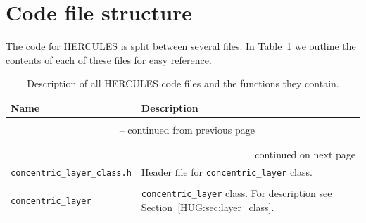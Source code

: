 \documentclass[11pt, oneside]{article}   	%
\begin{document}
\vspace{0.5 cm}

\section{Code file structure}
\label{HUG:sec:file_structure}

The code for HERCULES is split between several files. 
In Table~\ref{HUG:tab:files} we outline the contents of each of these files for easy reference.

\begin{longtable}{l p{10cm}}
\caption{Description of all HERCULES code files and the functions they contain. }
\label{HUG:tab:files} \\

Name & Description \\ \hline \hline
\multicolumn{2}{l}{} \\
\endfirsthead

\multicolumn{2}{c}{{\tablename\ \thetable{} -- continued from previous page}} \\
\multicolumn{2}{l}{} \\
\endhead

\multicolumn{2}{l}{} \\
\multicolumn{2}{r}{{continued on next page}} \\
\endfoot

\endlastfoot

\texttt{concentric\_layer\_class.h} & Header file for \texttt{concentric\_layer} class. \\
\hline \\
\texttt{concentric\_layer} & \texttt{concentric\_layer} class. For description see Section~\ref{HUG:sec:layer_class}. \\


\end{longtable}
\end{document}
